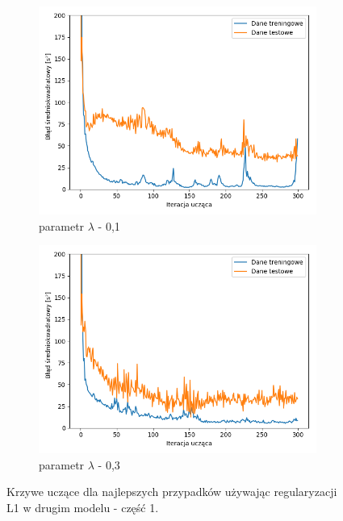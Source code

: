 \documentclass[12pt]{aghdpl}
\begin{document}
		\begin{figure}[h]
			\centering
			\begin{subfigure}{.8\linewidth}
		 		\includegraphics[width =\linewidth]{wykresy/6_regularyzacja/l1/regularyzacja_0_1_wykres_uczenia.png}
		 		\caption{parametr $\lambda$ - 0,1}
		 	\end{subfigure}
		 	\begin{subfigure}{.8\linewidth}
		 		\includegraphics[width =\linewidth]{wykresy/6_regularyzacja/l1/regularyzacja_0_3_wykres_uczenia.png}
		 		\caption{parametr $\lambda$ - 0,3}
		 	\end{subfigure}
		 	
			\caption{Krzywe uczące dla najlepszych przypadków używając regularyzacji L1 w drugim modelu - część 1.}
			\label{fig: drugi_model_przy_regularyzacji_l1_wykresy_uczenia_1}
		\end{figure}		 	
		 	
\end{document}
